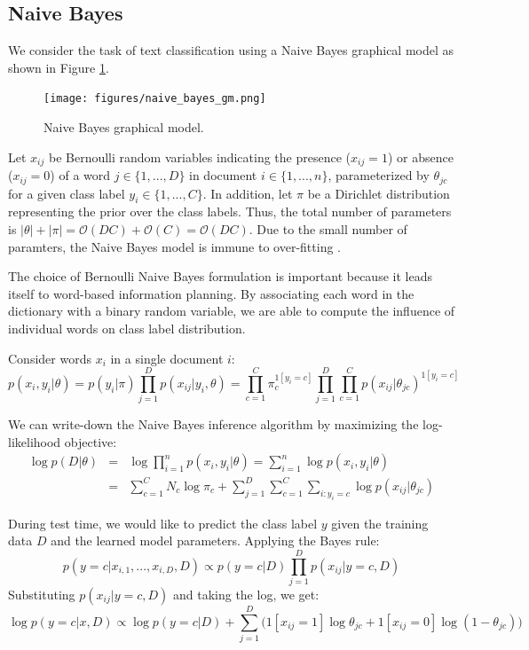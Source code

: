 \subsection{Naive Bayes}

We consider the task of text classification using a Naive Bayes graphical model as shown in Figure \ref{fig:nb_gm}. 

\begin{figure}[thpb]
    \centering
    \texttt{[image: figures/naive\_bayes\_gm.png]}
    \caption{Naive Bayes graphical model.}
    \label{fig:nb_gm}
\end{figure}

Let $x_{ij}$ be Bernoulli random variables indicating the presence ($x_{ij}=1$) or absence ($x_{ij}=0$) of a word $j \in \{1,...,D\}$ in document $i \in \{1,...,n\}$, parameterized by $\theta_{jc}$ for a given class label $y_i \in \{1,...,C\}$. In addition, let $\pi$ be a Dirichlet distribution representing the prior over the class labels. Thus, the total number of parameters is $|\theta| + |\pi| = \mathcal{O}(DC) + \mathcal{O}(C) = \mathcal{O}(DC)$. Due to the small number of paramters, the Naive Bayes model is immune to over-fitting \cite{MurphyML}.

The choice of Bernoulli Naive Bayes formulation is important because it leads itself to word-based information planning. By associating each word in the dictionary with a binary random variable, we are able to compute the influence of individual words on class label distribution.

Consider words $x_i$ in a single document $i$:
\begin{equation}
    p(x_i,y_i|\theta) = p(y_i|\pi)\prod_{j=1}^{D}p(x_{ij}|y_i,\theta) = \prod_{c=1}^{C}\pi_{c}^{1[y_i=c]}\prod_{j=1}^{D}\prod_{c=1}^{C}p(x_{ij}|\theta_{jc})^{1[y_i=c]} 
\end{equation}

We can write-down the Naive Bayes inference algorithm by maximizing the log-likelihood objective:
\begin{eqnarray}
   \log p(D|\theta) &=& \log \prod_{i=1}^{n}p(x_i,y_i|\theta) = \sum_{i=1}^{n}\log p(x_i, y_i|\theta) \nonumber \\
   &=& \sum_{c=1}^{C}N_c \log \pi_c + \sum_{j=1}^{D}\sum_{c=1}^{C}\sum_{i:y_i=c} \log p(x_{ij}|\theta_{jc}) 
\end{eqnarray}

During test time, we would like to predict the class label $y$ given the training data $D$ and the learned model parameters. Applying the Bayes rule:
\begin{equation}
    p(y=c|x_{i,1},...,x_{i,D}, D) \propto p(y=c|D) \prod_{j=1}^{D}p(x_{ij}|y=c,D) 
\end{equation}
Substituting $p(x_{ij}|y=c, D)$ and taking the log, we get:
\begin{equation}
    \log p(y=c|x,D)\propto \log p(y=c|D) + \sum_{j=1}^{D}\big(1[x_{ij}=1]\log \theta_{jc} + 1[x_{ij}=0]\log(1-\theta_{jc}) \big) 
\end{equation}


